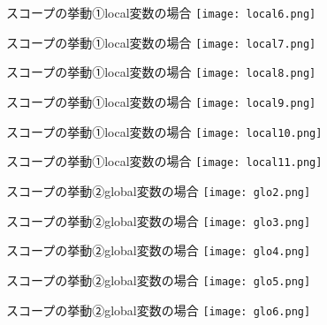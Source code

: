 \documentclass[uplatex,dvipdfmx,ja=standard]{beamer}
\begin{document}
\begin{frame}[fragile]{スコープの挙動①local変数の場合}
    \centering 
    \texttt{[image: local6.png]}
\end{frame}

\begin{frame}[fragile]{スコープの挙動①local変数の場合}
    \centering 
    \texttt{[image: local7.png]}
\end{frame}

\begin{frame}[fragile]{スコープの挙動①local変数の場合}
    \centering 
    \texttt{[image: local8.png]}
\end{frame}

\begin{frame}[fragile]{スコープの挙動①local変数の場合}
    \centering 
    \texttt{[image: local9.png]}
\end{frame}

\begin{frame}[fragile]{スコープの挙動①local変数の場合}
    \centering 
    \texttt{[image: local10.png]}
\end{frame}

\begin{frame}[fragile]{スコープの挙動①local変数の場合}
    \centering 
    \texttt{[image: local11.png]}
\end{frame}


\begin{frame}[fragile]{スコープの挙動②global変数の場合}
    \centering 
    \texttt{[image: glo2.png]}
\end{frame}

\begin{frame}[fragile]{スコープの挙動②global変数の場合}
    \centering 
    \texttt{[image: glo3.png]}
\end{frame}

\begin{frame}[fragile]{スコープの挙動②global変数の場合}
    \centering 
    \texttt{[image: glo4.png]}
\end{frame}

\begin{frame}[fragile]{スコープの挙動②global変数の場合}
    \centering 
    \texttt{[image: glo5.png]}
\end{frame}

\begin{frame}[fragile]{スコープの挙動②global変数の場合}
    \centering 
    \texttt{[image: glo6.png]}
\end{frame}
\end{document}
